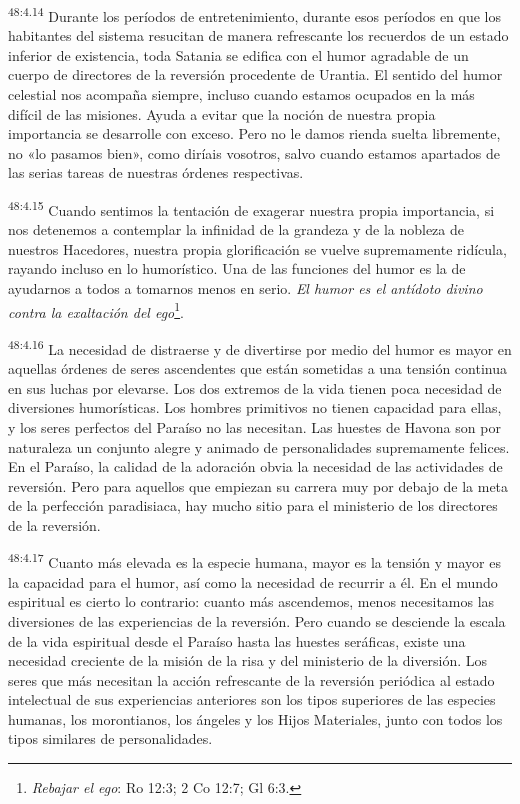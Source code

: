 \par
\textsuperscript{48:4.14} Durante los períodos de entretenimiento, durante esos períodos en que los habitantes del sistema resucitan de manera refrescante los recuerdos de un estado inferior de existencia, toda Satania se edifica con el humor agradable de un cuerpo de directores de la reversión procedente de Urantia. El sentido del humor celestial nos acompaña siempre, incluso cuando estamos ocupados en la más difícil de las misiones. Ayuda a evitar que la noción de nuestra propia importancia se desarrolle con exceso. Pero no le damos rienda suelta libremente, no «lo pasamos bien», como diríais vosotros, salvo cuando estamos apartados de las serias tareas de nuestras órdenes respectivas.

\par
\textsuperscript{48:4.15} Cuando sentimos la tentación de exagerar nuestra propia importancia, si nos detenemos a contemplar la infinidad de la grandeza y de la nobleza de nuestros Hacedores, nuestra propia glorificación se vuelve supremamente ridícula, rayando incluso en lo humorístico. Una de las funciones del humor es la de ayudarnos a todos a tomarnos menos en serio. \textit{El humor es el antídoto divino contra la exaltación del ego}\footnote{\textit{Rebajar el ego}: Ro 12:3; 2 Co 12:7; Gl 6:3.}.

\par
\textsuperscript{48:4.16} La necesidad de distraerse y de divertirse por medio del humor es mayor en aquellas órdenes de seres ascendentes que están sometidas a una tensión continua en sus luchas por elevarse. Los dos extremos de la vida tienen poca necesidad de diversiones humorísticas. Los hombres primitivos no tienen capacidad para ellas, y los seres perfectos del Paraíso no las necesitan. Las huestes de Havona son por naturaleza un conjunto alegre y animado de personalidades supremamente felices. En el Paraíso, la calidad de la adoración obvia la necesidad de las actividades de reversión. Pero para aquellos que empiezan su carrera muy por debajo de la meta de la perfección paradisiaca, hay mucho sitio para el ministerio de los directores de la reversión.

\par
\textsuperscript{48:4.17} Cuanto más elevada es la especie humana, mayor es la tensión y mayor es la capacidad para el humor, así como la necesidad de recurrir a él. En el mundo espiritual es cierto lo contrario: cuanto más ascendemos, menos necesitamos las diversiones de las experiencias de la reversión. Pero cuando se desciende la escala de la vida espiritual desde el Paraíso hasta las huestes seráficas, existe una necesidad creciente de la misión de la risa y del ministerio de la diversión. Los seres que más necesitan la acción refrescante de la reversión periódica al estado intelectual de sus experiencias anteriores son los tipos superiores de las especies humanas, los morontianos, los ángeles y los Hijos Materiales, junto con todos los tipos similares de personalidades.

